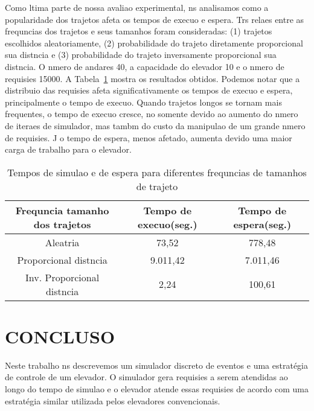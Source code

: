 \documentclass[12pt]{article}
\begin{document}
Como ltima parte de nossa avaliao experimental, ns analisamos como a popularidade dos trajetos afeta os tempos de execuo e espera. Trs relaes entre as frequncias dos trajetos e seus tamanhos foram consideradas: (1) trajetos escolhidos aleatoriamente, (2) probabilidade do trajeto diretamente proporcional  sua distncia e (3) probabilidade do trajeto inversamente proporcional  sua distncia. O nmero de andares  40, a capacidade do elevador  10 e o nmero de requisies  15000. A Tabela~\ref{tempos_freq_trajetos} mostra os resultados obtidos. Podemos notar que a distribuio das requisies afeta significativamente os tempos de execuo e espera, principalmente o tempo de execuo. Quando trajetos longos se tornam mais frequentes, o tempo de execuo cresce, no somente devido ao aumento do nmero de iteraes de simulador, mas tambm do custo da manipulao de um grande nmero de requisies. J o tempo de espera, menos afetado, aumenta devido  uma maior carga de trabalho para o elevador.

\begin{table}[ht!]
\centering
\begin{footnotesize}
\begin{tabular}{|c|c|c|}
\hline
\textbf{Frequncia tamanho dos trajetos}              & \textbf{Tempo de execuo(seg.)}      & \textbf{Tempo de espera(seg.)} \\ \hline
Aleatria			& 73,52	& 778,48	\\ \hline
Proporcional  distncia	& 9.011,42	& 7.011,46	\\ \hline
Inv. Proporcional  distncia	& 2,24	& 100,61	\\ \hline
\end{tabular}
\end{footnotesize}
\caption{Tempos de simulao e de espera para diferentes frequncias de tamanhos de trajeto \label{tempos_freq_trajetos}}
\end{table}

\section{CONCLUSO}
\label{conclusao}


Neste trabalho ns descrevemos um simulador discreto de eventos e uma estratégia de controle de um elevador. O simulador gera requisies a serem atendidas ao longo do tempo de simulao e o elevador atende  essas requisies de acordo com uma estratégia similar  utilizada pelos elevadores convencionais.
\end{document}
